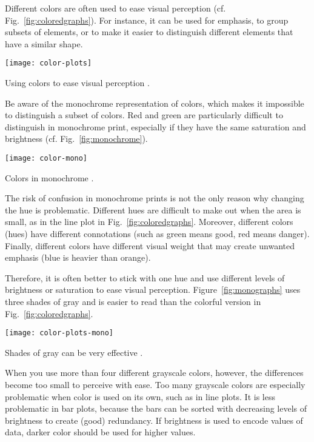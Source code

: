 Different colors are often used to ease visual perception (cf. Fig.~\ref{fig:coloredgraphs}). For instance, it can be used for emphasis, to group subsets of elements, or to make it easier to distinguish different elements that have a similar shape.

\begin{marginfigure}
\centering
\texttt{[image: color-plots]}
\caption{\label{fig:coloredgraphs} Using colors to ease visual perception \cite{Carter12}.}%
\end{marginfigure}


Be aware of the monochrome representation of colors, which makes it impossible to distinguish a subset of colors. Red and green are particularly difficult to distinguish in monochrome print, especially if they have the same saturation and brightness (cf. Fig.~\ref{fig:monochrome}).

\begin{marginfigure}
\centering
\texttt{[image: color-mono]}
\caption{\label{fig:monochrome} Colors in monochrome \cite{Carter12}.}%
\end{marginfigure}

The risk of confusion in monochrome prints is not the only reason why changing the hue is problematic. Different hues are difficult to make out when the area is small, as in the line plot in  Fig.~\ref{fig:coloredgraphs}. Moreover, different colors (hues) have different connotations (such as green means good, red means danger). Finally, different colors have different visual weight that may create unwanted emphasis (blue is heavier than orange).

Therefore, it is often better to stick with one hue and use different levels of brightness or saturation to ease visual perception. Figure~\ref{fig:monographs} uses three shades of gray and is easier to read than the colorful version in Fig.~\ref{fig:coloredgraphs}.


\begin{marginfigure}
\centering
\texttt{[image: color-plots-mono]}
\caption{\label{fig:monographs} Shades of gray can be very effective \cite{Carter12}.}%
\end{marginfigure}

When you use more than four different grayscale colors, however, the differences become too small to perceive with ease. Too many grayscale colors are especially problematic when color is used on its own, such as in line plots. It is less problematic in bar plots, because the bars can be sorted with decreasing levels of brightness to create (good) redundancy. If brightness is used to encode values of data, darker color should be used for higher values.

